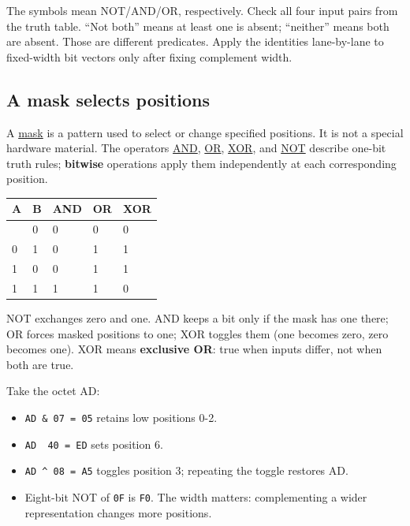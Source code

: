 The symbols mean NOT/AND/OR, respectively. Check all four input pairs from the truth table. ``Not both'' means at least one is absent; ``neither'' means both are absent. Those are different predicates. Apply the identities lane-by-lane to fixed-width bit vectors only after fixing complement width.

\subsection{A mask selects positions}\label{01-foundations-i-ch001-a-mask-selects-positions}

A \hyperref[appendix-dbe5905163c2]{mask} is a pattern used to select or change specified positions. It is not a special hardware material. The operators \hyperref[appendix-68b52453737c]{AND}, \hyperref[appendix-a427ce8ce8a6]{OR}, \hyperref[appendix-d49161831368]{XOR}, and \hyperref[appendix-8f38927cfc54]{NOT} describe one-bit truth rules; \textbf{bitwise} operations apply them independently at each corresponding position.

{\def\LTcaptype{none} %
\begin{longtable}[]{@{}lllll@{}}
\toprule\noalign{}
A & B & AND & OR & XOR \\
\midrule\noalign{}
\endhead
\bottomrule\noalign{}
\endlastfoot
0 & 0 & 0 & 0 & 0 \\
0 & 1 & 0 & 1 & 1 \\
1 & 0 & 0 & 1 & 1 \\
1 & 1 & 1 & 1 & 0 \\
\end{longtable}
}

NOT exchanges zero and one. AND keeps a bit only if the mask has one there; OR forces masked positions to one; XOR toggles them (one becomes zero, zero becomes one). XOR means \textbf{exclusive OR}: true when inputs differ, not when both are true.

Take the octet AD:

\begin{itemize}
\tightlist
\item
  \texttt{AD\ \&\ 07\ =\ 05} retains low positions 0-2.
\item
  \texttt{AD\ \textbar{}\ 40\ =\ ED} sets position 6.
\item
  \texttt{AD\ \^{}\ 08\ =\ A5} toggles position 3; repeating the toggle restores AD.
\item
  Eight-bit NOT of \texttt{0F} is \texttt{F0}. The width matters: complementing a wider representation changes more positions.
\end{itemize}

